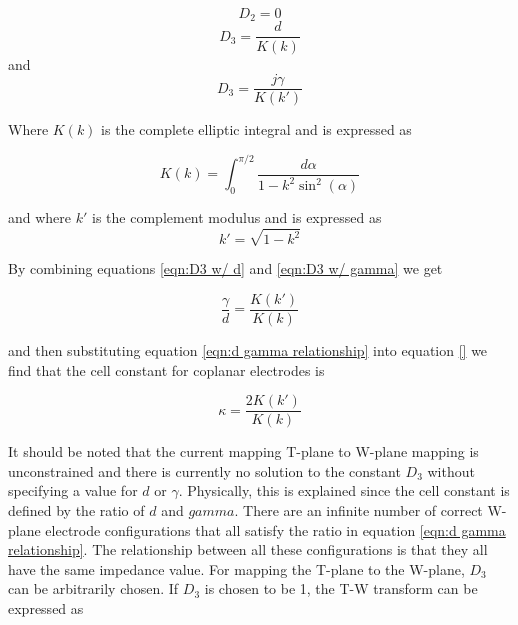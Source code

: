  \begin{equation}
     D_2 = 0
 \end{equation}
 \begin{equation}
     D_3 = \frac{d}{K(k)}
     \label{eqn:D3 w/ d}
 \end{equation}
\noindent and
\begin{equation}
    D_3 = \frac{j\gamma}{K(k')}
    \label{eqn:D3 w/ gamma}
\end{equation}

\noindent Where $K(k)$ is the complete elliptic integral and is expressed as 

 \begin{equation}
     K(k) = \int_0^{\pi/2} \frac{d\alpha}{1 - k^2\sin^2(\alpha)}
 \end{equation}
 
 \noindent and where $k'$ is the complement modulus and is expressed as 
 \begin{equation}
     k' = \sqrt{1-k^2}
 \end{equation}

\noindent By combining equations \ref{eqn:D3 w/ d} and \ref{eqn:D3 w/ gamma} we get

\begin{equation}
    \frac{\gamma}{d} = \frac{K(k')}{K(k)}
    \label{eqn:d gamma relationship}
\end{equation}

\noindent and then substituting equation \ref{eqn:d gamma relationship} into equation \ref{} we find that the cell constant for coplanar electrodes is 

\begin{equation}
    \kappa = \frac{2 K(k')}{K(k)}
\end{equation}

\par It should be noted that the current mapping T-plane to W-plane mapping is unconstrained and there is currently no solution to the constant $D_3$ without specifying a value for $d$ or $\gamma$. Physically, this is explained since the cell constant is defined by the ratio of $d$ and $gamma$. There are an infinite number of correct W-plane electrode configurations that all satisfy the ratio in equation \ref{eqn:d gamma relationship}. The relationship between all these configurations is that they all have the same impedance value. For mapping the T-plane to the W-plane, $D_3$ can be arbitrarily chosen. If $D_3$ is chosen to be 1, the T-W transform can be expressed as 

